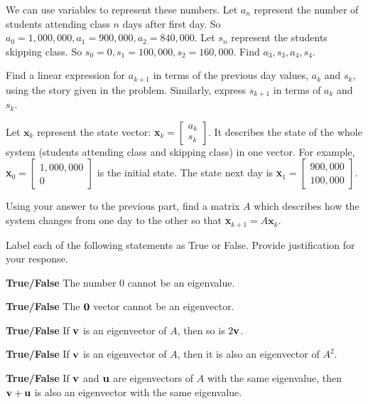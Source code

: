 We can use variables to represent these numbers. Let $a_n$ represent the number of students attending class $n$ days after first day. So $a_0=1,000,000, a_1=900,000, a_2=840,000$. Let $s_n$ represent the students skipping class. So $s_0=0, s_1=100,000, s_2=160,000$. Find $a_3, s_3, a_4, s_4$.

\item Find a linear expression for $a_{k+1}$ in terms of the previous day values, $a_k$ and $s_k$, using the story given in the problem. Similarly, express $s_{k+1}$ in terms of $a_k$ and $s_k$.


\item Let $\textbf{x}_k$ represent the state vector: \textbf{x}$_k=\begin{bmatrix} a_k\\s_k \end{bmatrix}$. It describes the state of the whole system (students attending class and skipping class) in one vector. For example, \textbf{x}$_0=\begin{bmatrix} 1,000,000\\0 \end{bmatrix}$ is the initial state. The state next day is \textbf{x}$_1=\begin{bmatrix} 900,000\\100,000 \end{bmatrix}$.

Using your answer to the previous part, find a matrix $A$ which describes how the system changes from one day to the other so that \textbf{x}$_{k+1} = A\textbf{x}_k$.

\ea

\item Label each of the following statements as True or False. Provide justification for your response.
\ba
\item \textbf{True/False} The number 0 cannot be an eigenvalue.

\item \textbf{True/False} The $\mathbf{0}$ vector cannot be an eigenvector.

\item \textbf{True/False} If $\mathbf{v}$ is an eigenvector of $A$, then so is $2\mathbf{v}$.

\item \textbf{True/False} If $\mathbf{v}$ is an eigenvector of $A$, then it is also an eigenvector of $A^2$.

\item \textbf{True/False} If $\mathbf{v}$ and $\mathbf{u}$ are eigenvectors of $A$ with the same eigenvalue, then $\mathbf{v}+\mathbf{u}$ is also an eigenvector with the same eigenvalue.


